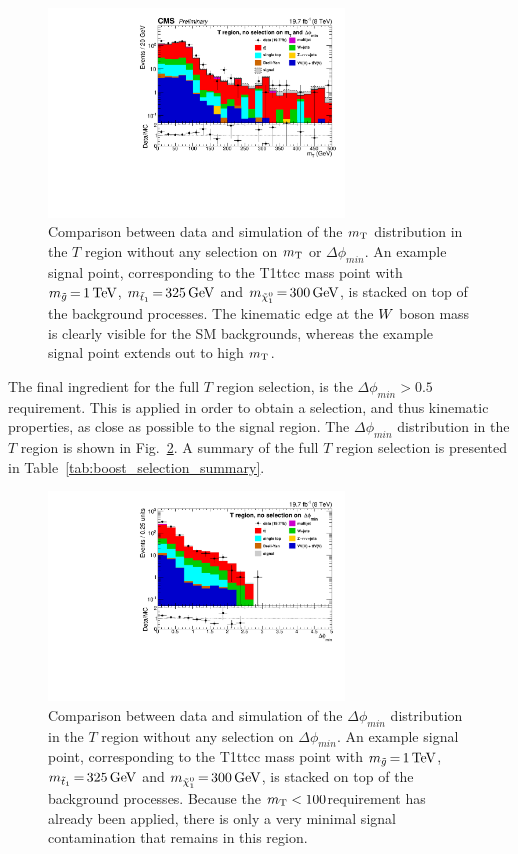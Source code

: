 \begin{figure}[htbp]
\centering
\includegraphics[width=0.7\textwidth]{figures/razor_selection/DataMC_mT_g1Mbg1W1Ll_rebin}
\caption{Comparison between data and simulation of the $m_{\mathrm{T}}$ distribution in the $T$ region without
any selection on $m_{\mathrm{T}}$ or $\Delta\phi_{min}$. An example signal
point, corresponding to the T1ttcc mass point with $m_{\tilde{g}} \,{=}\, 1\,\text{Te\hspace{-.08em}V}$,
$m_{\tilde{t}_1} \,{=}\, 325\,\text{Ge\hspace{-.08em}V}$ and $m_{\tilde{\chi}_1^0} \,{=}\, 300\,\text{Ge\hspace{-.08em}V}$, is stacked on top of
the
background processes. The kinematic edge at the $W$ boson mass is clearly
visible for the SM backgrounds, whereas the example signal point extends out to high $m_{\mathrm{T}}$.
\label{fig:boost_T_region_mT}}
\end{figure}

The final ingredient for the full $T$ region selection, is the $\Delta\phi_{min} > 0.5$
requirement. This is applied in order to obtain a selection, and thus kinematic properties, as close
as possible to the signal region. The $\Delta\phi_{min}$ distribution in the $T$ region is shown in
Fig.~\ref{fig:boost_T_region_mindeltaphi}. A summary of the full $T$ region selection is presented
in Table~\ref{tab:boost_selection_summary}. 


\begin{figure}[htbp]
\centering
\includegraphics[width=0.7\textwidth]
{figures/razor_selection/plots/DataMC_minDeltaPhi_g1Mbg1W1LlmT100_rebin}
\caption{Comparison between data and simulation of the $\Delta\phi_{min}$ distribution in the $T$
region without any selection on $\Delta\phi_{min}$. An example signal
point, corresponding to the T1ttcc mass point with $m_{\tilde{g}} \,{=}\, 1\,\text{Te\hspace{-.08em}V}$,
$m_{\tilde{t}_1} \,{=}\, 325\,\text{Ge\hspace{-.08em}V}$ and $m_{\tilde{\chi}_1^0} \,{=}\, 300\,\text{Ge\hspace{-.08em}V}$, is stacked on top of
the background processes. Because the $m_{\mathrm{T}} < 100$\GeV requirement has already been applied, there
is only a very minimal signal contamination that remains in this region.
\label{fig:boost_T_region_mindeltaphi}}
\end{figure}


